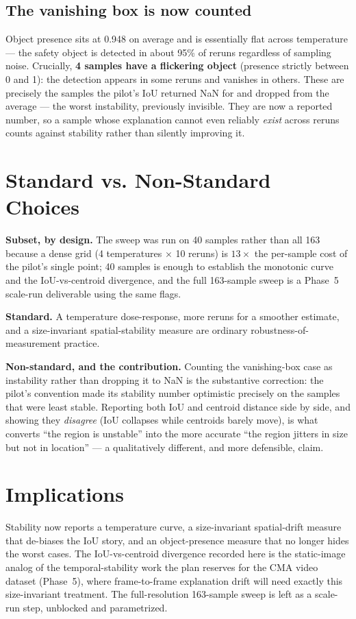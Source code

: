 \subsection{The vanishing box is now counted}

Object presence sits at 0.948 on average and is essentially flat across temperature --- the safety
object is detected in about 95\% of reruns regardless of sampling noise. Crucially, \textbf{4 samples
have a flickering object} (presence strictly between 0 and 1): the detection appears in some reruns and
vanishes in others. These are precisely the samples the pilot's IoU returned NaN for and dropped from
the average --- the worst instability, previously invisible. They are now a reported number, so a
sample whose explanation cannot even reliably \emph{exist} across reruns counts against stability
rather than silently improving it.

\section{Standard vs. Non-Standard Choices}

\textbf{Subset, by design.} The sweep was run on 40 samples rather than all 163 because a dense grid
(4 temperatures $\times$ 10 reruns) is $13\times$ the per-sample cost of the pilot's single point; 40
samples is enough to establish the monotonic curve and the IoU-vs-centroid divergence, and the full
163-sample sweep is a Phase~5 scale-run deliverable using the same flags.

\textbf{Standard.} A temperature dose-response, more reruns for a smoother estimate, and a
size-invariant spatial-stability measure are ordinary robustness-of-measurement practice.

\textbf{Non-standard, and the contribution.} Counting the vanishing-box case as instability rather than
dropping it to NaN is the substantive correction: the pilot's convention made its stability number
optimistic precisely on the samples that were least stable. Reporting both IoU and centroid distance
side by side, and showing they \emph{disagree} (IoU collapses while centroids barely move), is what
converts ``the region is unstable'' into the more accurate ``the region jitters in size but not in
location'' --- a qualitatively different, and more defensible, claim.

\section{Implications}

Stability now reports a temperature curve, a size-invariant spatial-drift measure that de-biases the
IoU story, and an object-presence measure that no longer hides the worst cases. The IoU-vs-centroid
divergence recorded here is the static-image analog of the temporal-stability work the plan reserves
for the CMA video dataset (Phase~5), where frame-to-frame explanation drift will need exactly this
size-invariant treatment. The full-resolution 163-sample sweep is left as a scale-run step, unblocked
and parametrized.
